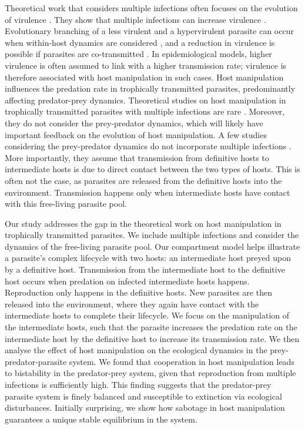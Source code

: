 \documentclass[11pt]{article}
\begin{document}
Theoretical work that considers multiple infections often focuses on the evolution of virulence \citep{vanBaalen1995, Alizon2013, Alizon2008, Choisy2010, Alizon2012}. 
They show that multiple infections can increase virulence \citep{vanBaalen1995, Choisy2010}.
Evolutionary branching of a less virulent and a hypervirulent parasite can occur when within-host dynamics are considered \citep{ Alizon2008}, and a reduction in virulence is possible if parasites are co-transmitted \citep{Alizon2012}. 
In epidemiological models, higher virulence is often assumed to link with a higher transmission rate; virulence is therefore associated with host manipulation in such cases. 
Host manipulation influences the predation rate in trophically transmitted parasites, predominantly affecting predator-prey dynamics. 
Theoretical studies on host manipulation in trophically transmitted parasites with multiple infections are rare \citep{Parker2003,Vickery2009}. Moreover, they do not consider the prey-predator dynamics, which will likely have important feedback on the evolution of host manipulation. 
A few studies considering the prey-predator dynamics do not incorporate multiple infections \citep{Rogawa2018, Iritani2018, Hadeler1989, Fenton2006}. 
More importantly, they assume that transmission from definitive hosts to intermediate hosts is due to direct contact between the two types of hosts. 
This is often not the case, as parasites are released from the definitive hosts into the environment. 
Transmission happens only when intermediate hosts have contact with this free-living parasite pool.

Our study addresses the gap in the theoretical work on host manipulation in trophically transmitted parasites.
We include multiple infections and consider the dynamics of the free-living parasite pool. 
Our compartment model helps illustrate a parasite's complex lifecycle with two hosts: an intermediate host preyed upon by a definitive host. 
Transmission from the intermediate host to the definitive host occurs when predation on infected intermediate hosts happens. 
Reproduction only happens in the definitive hosts. 
New parasites are then released into the environment, where they again have contact with the intermediate hosts to complete their lifecycle. 
We focus on the manipulation of the intermediate hosts, such that the parasite increases the predation rate on the intermediate host by the definitive host to increase its transmission rate. 
We then analyse the effect of host manipulation on the ecological dynamics in the prey-predator-parasite system. 
We found that cooperation in host manipulation leads to bistability in the predator-prey system, given that reproduction from multiple infections is sufficiently high. 
This finding suggests that the predator-prey parasite system is finely balanced and susceptible to extinction via ecological disturbances.
Initially surprising, we show how sabotage in host manipulation guarantees a unique stable equilibrium in the system. 
\end{document}
